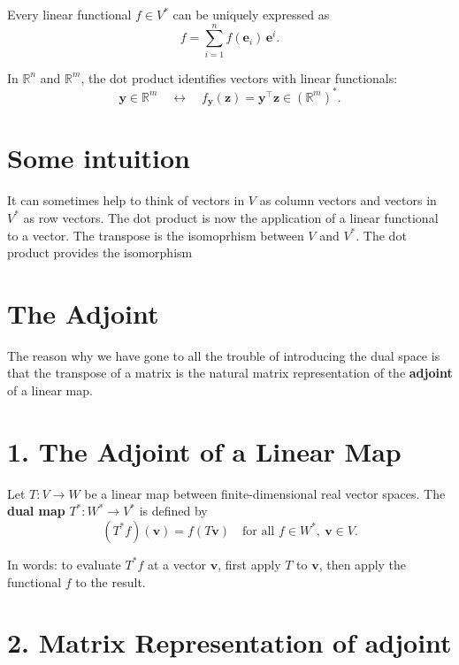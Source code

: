 \documentclass[11pt]{article}
\begin{document}
    Every linear functional $ f \in V^* $ can be uniquely expressed as
    \[
    f = \sum_{i=1}^n f(\mathbf{e}_i) \, \mathbf{e}^i.
    \]



In $ \mathbb{R}^n $ and $ \mathbb{R}^m $, the dot product identifies vectors with linear functionals:
\[
\mathbf{y} \in \mathbb{R}^m \quad \longleftrightarrow \quad f_{\mathbf{y}}(\mathbf{z}) = \mathbf{y}^\top \mathbf{z} \in (\mathbb{R}^m)^*.
\]







\section*{Some intuition}

It can sometimes help to think of vectors in $V$ as column vectors and vectors in $V^*$ as row vectors. The dot product is now the application of a linear functional to a vector. The transpose is the isomoprhism between $V$ and $V^*$. The dot product provides the isomorphism



\section*{The Adjoint}

The reason why we have gone to all the trouble of introducing the dual space is that the transpose of a matrix is the natural matrix representation of the \textbf{adjoint} of a linear map. 

\section*{1. The Adjoint of a Linear Map}

Let $ T: V \to W $ be a linear map between finite-dimensional real vector spaces.  
The \textbf{dual map} $ T^*: W^* \to V^* $ is defined by
\[
(T^* f)(\mathbf{v}) = f(T\mathbf{v}) \quad \text{for all } f \in W^*,\ \mathbf{v} \in V.
\]

In words: to evaluate $ T^* f $ at a vector $ \mathbf{v} $, first apply $ T $ to $ \mathbf{v} $, then apply the functional $ f $ to the result.  

\section*{2. Matrix Representation of adjoint}
\end{document}
